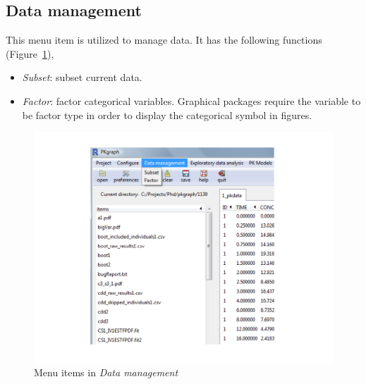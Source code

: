 \documentclass[a4paper]{article}
\begin{document}
\subsection{Data management}
This menu item is utilized to manage data. It has the following functions (Figure~\ref{data}),
\begin{itemize}
	\item \textit{Subset}: subset current data.
	\item \textit{Factor}: factor categorical variables. Graphical packages require the variable to be factor type in order to display the categorical symbol in figures.	
\end{itemize}
\begin{figure}[h!tb] \centering
\includegraphics[scale=0.6]{data.pdf}
\caption{Menu items in \textit{Data management}}
\label{data}
\end{figure}
\end{document}
